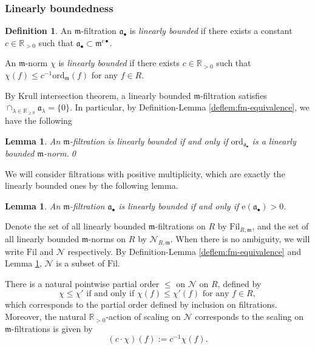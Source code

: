 \documentclass[11pt, leqno]{amsart}%
\theoremstyle{plain}
\newtheorem{lemma}[theorem]{Lemma}
\theoremstyle{definition}
\newtheorem{definition}[theorem]{Definition}
\theoremstyle{remark}
\newcommand{\cN}{\mathcal{N}}
\newcommand{\bR}{\mathbb{R}}
\newcommand{\fa}{\mathfrak{a}}
\newcommand{\fm}{\mathfrak{m}}
\newcommand{\ord}{\mathrm{ord}}
\newcommand{\e}{\mathrm{e}}
\newcommand{\Fil}{\mathrm{Fil}}
\numberwithin{equation}{section}
\begin{document}
\subsubsection{Linearly boundedness}\label{sssec:linearly bounded}

\begin{definition}\label{defn:linearly bounded}
    An $\fm$-filtration $\fa_\bullet$ is \emph{linearly bounded} if there exists a constant $c\in\bR_{>0}$ such that $\fa_{\bullet} \subset \fm^{c\bullet}$. 
	
    An $\fm$-norm $\chi$ is \emph{linearly bounded} if there exists $c\in\bR_{>0}$ such that $\chi(f)\le c^{-1}\ord_\fm(f)$ for any $f\in R$. 
\end{definition}


    
By Krull intersection theorem, a linearly bounded $\fm$-filtration satisfies $\cap_{\lambda\in\bR_{\ge 0}}\fa_\lambda=\{0\}$. In particular, by Definition-Lemma \ref{deflem:fm-equivalence}, we have the following 

\begin{lemma}\label{lem:fm-equivalence lin bounded}
    An $\fm$-filtration is linearly bounded if and only if $\ord_{\fa_\bullet}$ is a linearly bounded $\fm$-norm.\qed
\end{lemma}


We will consider filtrations with positive multiplicity, which are exactly the linearly bounded ones by the following lemma.

\begin{lemma}\cite[Corollary 3.18]{BLQ22}\label{lem:e>0 iff linearly bounded}
    An $\fm$-filtration $\fa_\bullet$ is linearly bounded if and only if $\e(\fa_\bullet)>0$.
\end{lemma}

Denote the set of all linearly bounded $\fm$-filtrations on $R$ by $\Fil_{R,\fm}$, and the set of all linearly bounded $\fm$-norms on $R$ by $\cN_{R,\fm}$. When there is no ambiguity, we will write $\Fil$ and $\cN$ respectively. By Definition-Lemma \ref{deflem:fm-equivalence} and Lemma \ref{lem:fm-equivalence lin bounded}, $\cN$ is a subset of $\Fil$. 

There is a natural pointwise partial order $\le$ on $\cN$ on $R$, defined by
\[
    \chi\le \chi' \text{ if and only if } \chi(f)\le \chi'(f) \text{ for any } f\in R,
\]
which corresponds to the partial order defined by inclusion on filtrations. Moreover, the natural $\bR_{>0}$-action of scaling on $\cN$ corresponds to the scaling on $\fm$-filtrations is given by
\[
(c\cdot\chi)(f):=c^{-1}\chi(f).
\]
\end{document}
